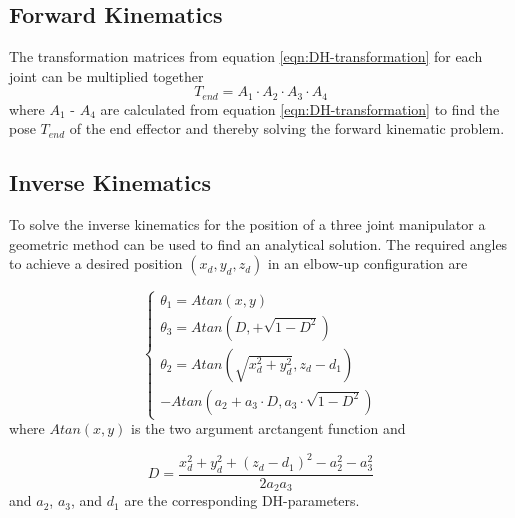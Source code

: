 \subsection*{Forward Kinematics}
The transformation matrices from equation \ref{eqn:DH-transformation} for each joint can be multiplied together
\begin{equation}
    T_{end} = A_1 \cdot A_2 \cdot A_3 \cdot A_4
\end{equation}
where \(A_1\) - \(A_4\) are calculated from equation \ref{eqn:DH-transformation} to find the pose \(T_{end}\) of the end effector and thereby solving the forward kinematic problem.


\subsection*{Inverse Kinematics}
To solve the inverse kinematics for the position of a three joint manipulator a geometric method can be used to find an analytical solution. The required angles to achieve a desired position \((x_d, y_d, z_d)\) in an elbow-up configuration are \cite{Lec14_mit_Manipulation}

\begin{equation}
    \begin{cases}
        \theta_1 = Atan(x, y) \\
        \theta_3 = Atan(D, +\sqrt{1 - D^2}) \\
        \theta_2 = Atan(\sqrt{x_d^2 + y_d^2}, z_d - d_1) \\- Atan(a_2 + a_3 \cdot D, a_3 \cdot \sqrt{1 - D^2}) %
    \end{cases}
\end{equation}
where \(Atan(x, y)\) is the two argument arctangent function \cite{inverse_tangent_wolfram} and 

\begin{equation}
    D = \frac{x_d^2 + y_d^2 + (z_d - d_1)^2 - a_2^2 - a_3^2}{2 a_2 a_3}
\end{equation}
and \(a_2\), \(a_3\), and \(d_1\)   are the corresponding DH-parameters.



